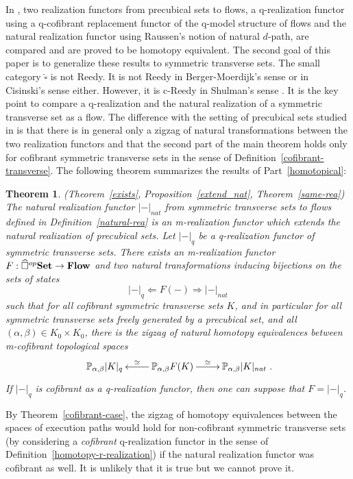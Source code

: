 \documentclass[a4paper,12pt]{amsart}
\makeatletter
\newcommand{\p}{\times}
\newtheorem*{thmN}{Theorem}
\theoremstyle{definition}
\newcommand{\fl}[1]{\ar@{->}[l]_-{#1}}
\newcommand{\fr}[1]{\ar@{->}[r]^-{#1}}
\newcommand{\brm}[1]{{\rm{\mathbf{#1}}}}
\newcommand{\dtop}{{\brm{Flow}}}
\newcommand{\set}{{\brm{Set}}}
\renewcommand{\P}{\mathbb{P}}
\makeatother
\begin{document}
In \cite{NaturalRealization}, two realization functors from precubical sets to flows, a q-realization functor using a q-cofibrant replacement functor of the q-model structure of flows and the natural realization functor using Raussen's notion of natural $d$-path, are compared and are proved to be homotopy equivalent. The second goal of this paper is to generalize these results to symmetric transverse sets. The small category $\widehat{\square}$ is not Reedy. It is not Reedy in Berger-Moerdijk's sense \cite[Definition~1.1]{g-Reedy} or in Cisinski's sense \cite[Definition~8.1.1]{Cisinski-Book} either. However, it is c-Reedy in Shulman's sense \cite[Definition~8.25]{c-Reedy}. It is the key point to compare a q-realization and the natural realization of a symmetric transverse set as a flow. The difference with the setting of precubical sets studied in \cite{NaturalRealization} is that there is in general only a zigzag of natural transformations between the two realization functors and that the second part of the main theorem holds only for cofibrant symmetric transverse sets in the sense of Definition~\ref{cofibrant-transverse}. The following theorem summarizes the results of Part~\ref{homotopical}:  

\begin{thmN} (Theorem~\ref{exists}, Proposition~\ref{extend_nat}, Theorem~\ref{same-rea})
The natural realization functor $|-|_{nat}$ from symmetric transverse sets to flows defined in Definition~\ref{natural-rea} is an m-realization functor which extends the natural realization of precubical sets. Let $|-|_q$ be a q-realization functor of symmetric transverse sets. There exists an m-realization functor $F:\widehat{\square}^{op}\set \to \dtop$ and two natural transformations inducing bijections on the sets of states \[|-|_q\Longleftarrow F(-)\Longrightarrow |-|_{nat}\] such that for all cofibrant symmetric transverse sets $K$, and in particular for all symmetric transverse sets freely generated by a precubical set, and all $(\alpha,\beta)\in K_0\p K_0$, there is the zigzag of natural homotopy equivalences between m-cofibrant topological spaces 
\[\xymatrix
{
	\P_{\alpha,\beta} |K|_q & \fl{\simeq}  \P_{\alpha,\beta} F(K) \fr{\simeq} &\P_{\alpha,\beta} |K|_{nat}
}
.\] If $|-|_{q}$ is cofibrant as a q-realization functor, then one can suppose that $F= |-|_{q}$.
\end{thmN}

By Theorem~\ref{cofibrant-case}, the zigzag of homotopy equivalences between the spaces of execution paths would hold for non-cofibrant symmetric transverse sets (by considering a \textit{cofibrant} q-realization functor in the sense of Definition~\ref{homotopy-r-realization}) if the natural realization functor was cofibrant as well. It is unlikely that it is true but we cannot prove it. 
\end{document}
